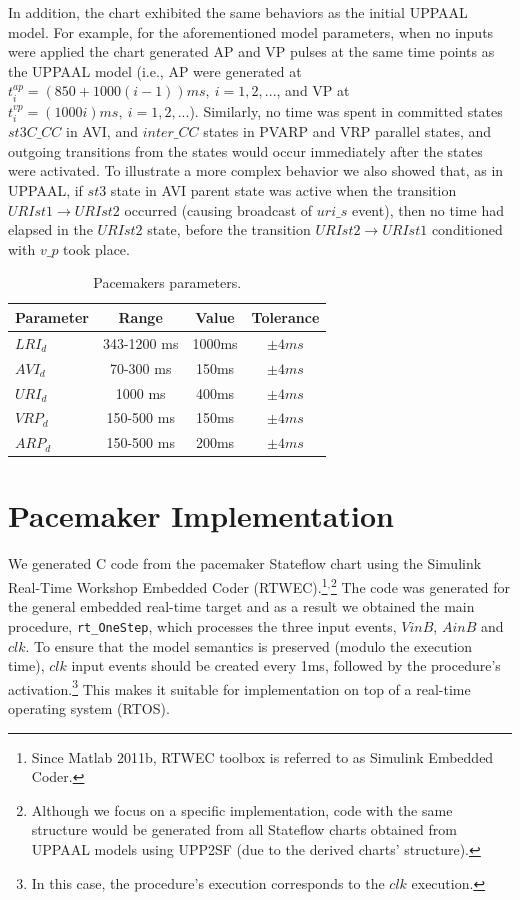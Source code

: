 In addition, the chart exhibited the same behaviors as the initial UPPAAL model. For example, for the aforementioned model parameters, when no inputs were applied the chart generated AP and VP pulses at the same time points as the UPPAAL model (i.e., AP were generated at  $t^{ap}_i=(850+1000(i-1))ms,~i=1,2, ...$, and VP at $t^{vp}_i=(1000i)ms,~i=1,2, ...$). 
Similarly, no time was spent in committed states $st3C\_CC$ in AVI, and $inter\_CC$ states in PVARP and VRP parallel states, and outgoing transitions from the states would occur immediately after the states were activated. To illustrate a more complex behavior we also showed that, as in UPPAAL, if $st3$ state in AVI parent state was active when the transition $URIst1\rightarrow URIst2$ occurred (causing broadcast of $uri\_s$ event), then no time had elapsed in the $URIst2$ state, before the transition $URIst2\rightarrow URIst1$ conditioned with $v\_p$ took place.


\begin{table}[!b]

{
\begin{tabular}{|l|c|c|c|}
\hline
Parameter & Range & Value & Tolerance \\ 
\hline
$LRI_{d}$ & 343-1200 ms & 1000ms & $\pm 4ms$  \\\hline
$AVI_{d}$ & 70-300 ms   &  150ms & $\pm 4ms$  \\\hline
$URI_{d}$ & 1000 ms     &  400ms & $\pm 4ms$  \\\hline
$VRP_{d}$ & 150-500 ms  &  150ms & $\pm 4ms$  \\\hline
$ARP_{d}$ & 150-500 ms  &  200ms & $\pm 4ms$  \\\hline
\end{tabular}}
\caption{Pacemakers parameters.
}
\label{tab:params}
\end{table}

\section{Pacemaker Implementation}
\label{sec:code}


We generated C code from the pacemaker Stateflow chart using the Simulink Real-Time Workshop Embedded Coder (RTWEC).\footnote{Since Matlab 2011b, RTWEC toolbox is referred to as Simulink Embedded Coder.}$^,$\footnote{Although we focus on a specific implementation, code with the same structure would be generated from all Stateflow charts obtained from UPPAAL models using UPP2SF (due to the derived charts' structure).} 
The code was generated for the general embedded real-time target and as a result we obtained the main procedure, \texttt{rt\_OneStep}, which processes the three input events, $VinB$, $AinB$ and $clk$. To ensure that the model semantics is preserved (modulo the execution time), $clk$ input events should be created every 1ms, followed by the procedure's activation.\footnote{In this case, the procedure's execution corresponds to the $clk$ execution.}  This makes it suitable for implementation on top of a real-time operating system (RTOS).

